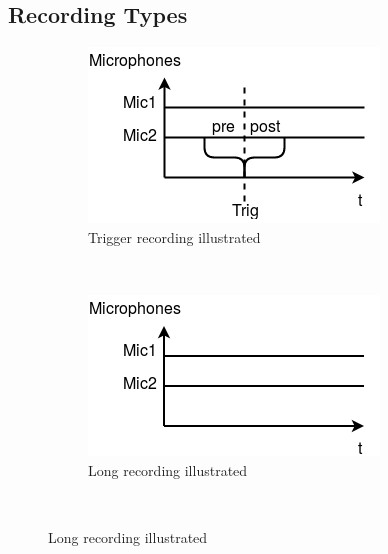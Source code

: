 \subsection{Recording Types} \label{sec:usecase:recordingtypes}
\begin{figure}[H]
    \centering
    \begin{subfigure}[b]{0.3\textwidth}
        \includegraphics[width=\textwidth]{figures/recording_trigger.png}
        \caption{Trigger recording illustrated}
        \label{fig:usecase:triggerrecording}
    \end{subfigure}
    ~ %
    \begin{subfigure}[b]{0.3\textwidth}
        \includegraphics[width=\textwidth]{figures/recording_long.png}
        \caption{Long recording illustrated}
        \label{fig:usecase:longrecording}
    \end{subfigure}
    ~ %

\end{figure}
